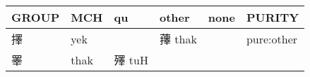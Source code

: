 \documentclass[14pt,a4paper]{scrartcl}
\begin{document}
\begin{longtable}[c]{@{}llllll@{}}
\toprule
\begin{minipage}[b]{0.14\columnwidth}\raggedright\strut
GROUP
\strut\end{minipage} &
\begin{minipage}[b]{0.14\columnwidth}\raggedright\strut
MCH
\strut\end{minipage} &
\begin{minipage}[b]{0.14\columnwidth}\raggedright\strut
qu
\strut\end{minipage} &
\begin{minipage}[b]{0.14\columnwidth}\raggedright\strut
other
\strut\end{minipage} &
\begin{minipage}[b]{0.14\columnwidth}\raggedright\strut
none
\strut\end{minipage} &
\begin{minipage}[b]{0.14\columnwidth}\raggedright\strut
PURITY
\strut\end{minipage}\tabularnewline
\midrule
\endhead
\begin{minipage}[t]{0.14\columnwidth}\raggedright\strut
擇
\strut\end{minipage} &
\begin{minipage}[t]{0.14\columnwidth}\raggedright\strut
yek
\strut\end{minipage} &
\begin{minipage}[t]{0.14\columnwidth}\raggedright\strut
\strut\end{minipage} &
\begin{minipage}[t]{0.14\columnwidth}\raggedright\strut
蘀 thak
\strut\end{minipage} &
\begin{minipage}[t]{0.14\columnwidth}\raggedright\strut
\strut\end{minipage} &
\begin{minipage}[t]{0.14\columnwidth}\raggedright\strut
pure:other
\strut\end{minipage}\tabularnewline
\begin{minipage}[t]{0.14\columnwidth}\raggedright\strut
睪
\strut\end{minipage} &
\begin{minipage}[t]{0.14\columnwidth}\raggedright\strut
thak
\strut\end{minipage} &
\begin{minipage}[t]{0.14\columnwidth}\raggedright\strut
殬 tuH
\strut\end{minipage} &
\begin{minipage}[t]{0.14\columnwidth}\raggedright\strut

\end{minipage}
\end{longtable}
\end{document}
